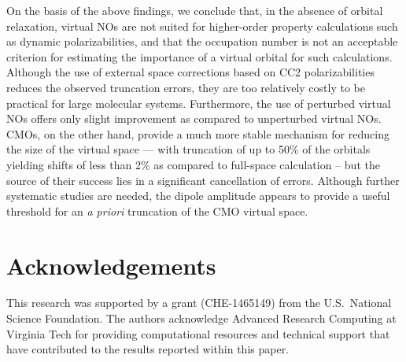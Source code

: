 On the basis of the above findings, we conclude that, in the absence of
orbital relaxation, virtual NOs are not
suited for higher-order property calculations such as dynamic
polarizabilities, and that the occupation number is not an acceptable
criterion for estimating the importance of a virtual orbital for such
calculations.  Although the use of external space corrections based on CC2
polarizabilities reduces the observed truncation errors, they are too
relatively costly to be practical for large molecular systems.  Furthermore,
the use of perturbed virtual NOs offers only slight improvement as compared to
unperturbed virtual NOs.  CMOs, on the other hand, provide a much more stable
mechanism for reducing the size of the virtual space --- with truncation of up
to 50\% of the orbitals yielding shifts of less than 2\% as compared to
full-space calculation -- but the source of their success lies in a
significant cancellation of errors.  Although further systematic studies are
needed, the dipole amplitude appears to provide a useful threshold for an {\em
a priori} truncation of the CMO virtual space.

\section{Acknowledgements}

This research was supported by a grant (CHE-1465149) from the U.S.\
National Science Foundation. The authors acknowledge Advanced Research
Computing at Virginia Tech for providing computational resources and
technical support that have contributed to the results reported within this
paper.

%
%
%
%
%
%
